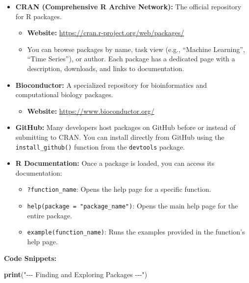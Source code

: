 \documentclass[
]{article}
\newenvironment{Shaded}{\begin{snugshade}}{\end{snugshade}}
\newcommand{\FunctionTok}[1]{\textcolor[rgb]{0.13,0.29,0.53}{\textbf{#1}}}
\newcommand{\NormalTok}[1]{#1}
\newcommand{\StringTok}[1]{\textcolor[rgb]{0.31,0.60,0.02}{#1}}
\providecommand{\tightlist}{%
  \setlength{\itemsep}{0pt}\setlength{\parskip}{0pt}}
\begin{document}
\begin{itemize}
\tightlist
\item
  \textbf{CRAN (Comprehensive R Archive Network):} The official
  repository for R packages.

  \begin{itemize}
  \tightlist
  \item
    \textbf{Website:} \url{https://cran.r-project.org/web/packages/}
  \item
    You can browse packages by name, task view (e.g., ``Machine
    Learning'', ``Time Series''), or author. Each package has a
    dedicated page with a description, downloads, and links to
    documentation.
  \end{itemize}
\item
  \textbf{Bioconductor:} A specialized repository for bioinformatics and
  computational biology packages.

  \begin{itemize}
  \tightlist
  \item
    \textbf{Website:} \url{https://www.bioconductor.org/}
  \end{itemize}
\item
  \textbf{GitHub:} Many developers host packages on GitHub before or
  instead of submitting to CRAN. You can install directly from GitHub
  using the \texttt{install\_github()} function from the
  \texttt{devtools} package.
\item
  \textbf{R Documentation:} Once a package is loaded, you can access its
  documentation:

  \begin{itemize}
  \tightlist
  \item
    \texttt{?function\_name}: Opens the help page for a specific
    function.
  \item
    \texttt{help(package\ =\ "package\_name")}: Opens the main help page
    for the entire package.
  \item
    \texttt{example(function\_name)}: Runs the examples provided in the
    function's help page.
  \end{itemize}
\end{itemize}

\textbf{Code Snippets:}

\begin{Shaded}
\begin{Highlighting}[]
\FunctionTok{print}\NormalTok{(}\StringTok{"{-}{-}{-} Finding and Exploring Packages {-}{-}{-}"}\NormalTok{)}
\end{Highlighting}
\end{Shaded}
\end{document}
